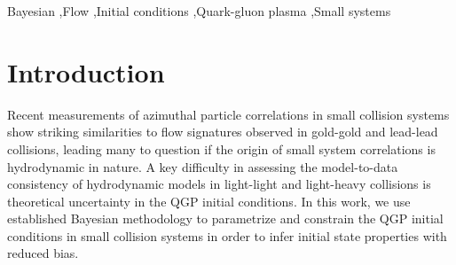 \documentclass[3p,times,procedia]{elsarticle}
\begin{document}
\begin{frontmatter}
\begin{keyword}
  Bayesian \sep Flow \sep Initial conditions \sep Quark-gluon plasma \sep Small systems


\end{keyword}

\end{frontmatter}


\section{Introduction}

Recent measurements of azimuthal particle correlations in small collision systems show striking similarities to flow signatures observed in gold-gold and lead-lead collisions, leading many to question if the origin of small system correlations is hydrodynamic in nature.
A key difficulty in assessing the model-to-data consistency of hydrodynamic models in light-light and light-heavy collisions is theoretical uncertainty in the QGP initial conditions.
In this work, we use established Bayesian methodology \cite{Higdon:2008cmc} to parametrize and constrain the QGP initial conditions in small collision systems in order to infer initial state properties with reduced bias.
\end{document}

